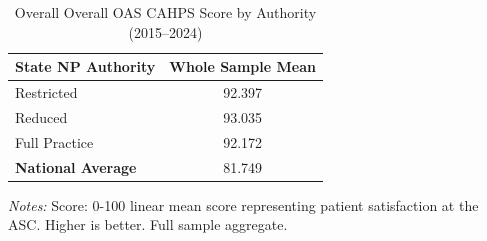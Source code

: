 \begin{table}[htbp]
    \centering
    \caption{Overall Overall OAS CAHPS Score by Authority (2015--2024)}
    \label{tab:oas_100_score_full}
    \vspace{0.2cm}
    \begin{tabular}{lc}
        \toprule
        \textbf{State NP Authority} & \textbf{Whole Sample Mean} \\
        \midrule
        Restricted & 92.397 \\
        Reduced & 93.035 \\
        Full Practice & 92.172 \\
        \midrule
        \textbf{National Average} & 81.749 \\
        \bottomrule
    \end{tabular}
    \vspace{0.1cm}
    \begin{minipage}{0.6\textwidth}
        \footnotesize \textit{Notes:} Score: 0-100 linear mean score representing patient satisfaction at the ASC. Higher is better. Full sample aggregate.
    \end{minipage}
\end{table}